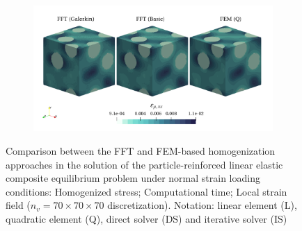 \begin{figure}[hbt]
\begin{subfigure}[b]{0.49\textwidth}
    \caption{}
    \label{subfig:linear_3D_normal_cpu_time_vs_n_voxels}
  \end{subfigure}
  \begin{subfigure}[b]{\textwidth}
    \centering
    \includegraphics[width=\textwidth]{figures/linear_3D_normal_strain_11}
    \caption{}
    \label{subfig:linear_3D_normal_strain_11}
  \end{subfigure}
  \caption{Comparison between the FFT and FEM-based homogenization approaches in the
  solution of the particle-reinforced linear elastic composite equilibrium problem under normal
  strain loading conditions:  Homogenized stress;  Computational time;  Local strain field
  (\(n_v = 70 \times 70\times 70\) discretization). Notation: linear element (L), quadratic element (Q), direct solver
  (DS) and iterative solver (IS)}
\label{fig:linear_3D_normal}
\end{figure}

